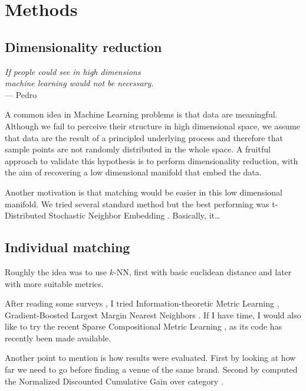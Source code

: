 \chapter{Methods}
\label{chap:methods}

\section{Dimensionality reduction}

\begin{flushright}{\slshape
 If people could see in high dimensions \\
 machine learning would not be necessary.
} \\ \medskip
--- Pedro \Textcite{MLKnowledge12}
\end{flushright}

A common idea in Machine Learning problems is that data are meaningful.
Although we fail to perceive their structure in high dimensional space, we
assume that data are the result of a principled underlying process and
therefore that sample points are not randomly distributed in the whole space.
A fruitful approach to validate this hypothesis is to perform dimensionality
reduction, with the aim of recovering a low dimensional manifold that embed
the data.

Another motivation is that matching would be easier in this low dimensional
manifold. We tried several standard method but the best performing was
t-Distributed Stochastic Neighbor Embedding \autocite{tSNE08}. Basically, it…

\section{Individual matching}

Roughly the idea was to use $k$-NN, first with basic euclidean distance and
later with more suitable metrics.

After reading some surveys \autocite{MetricSurvey06, MetricSurvey13}, I tried
Information-theoretic Metric Learning \autocite{InfoMetric07},
Gradient-Boosted Largest Margin Nearest Neighbors \autocite{GBLMNN12}. If I
have time, I would also like to try the recent Sparse Compositional Metric
Learning \autocite{SparseMetric14}, as its code has recently been made available.

Another point to mention is how results were evaluated. First by looking at
how far we need to go before finding a venue of the same brand. Second by
computed the Normalized Discounted Cumulative Gain over category
\autocite{IREvaluation07}.


